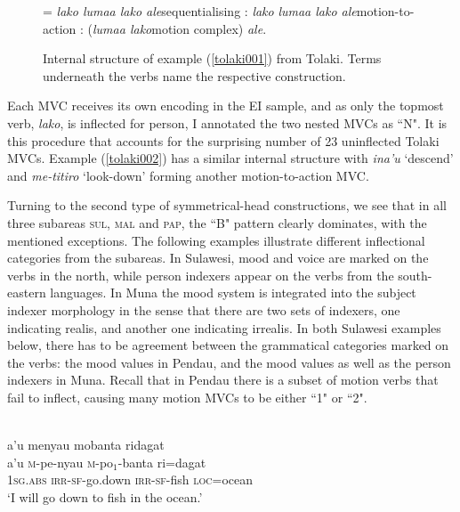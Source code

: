 \begin{figure}[h]
\jtree[xunit=8em,yunit=1em]
\! = {\textit{lako lumaa lako ale}}{sequentialising}
: {\textit{lako}} {\textit{lumaa lako ale}}{motion-to-action}
: ({\textit{lumaa lako}}{motion complex}) {\textit{ale}}.
\endjtree
\caption[Internal structure of example (\ref{tolaki001}) from Tolaki]{Internal structure of example (\ref{tolaki001}) from Tolaki. Terms underneath the verbs name the respective construction.}
\label{figure:tolakiMVC}
\end{figure}

Each MVC receives its own encoding in the EI sample, and as only the topmost verb, \textit{lako}, is inflected for person, I annotated the two nested MVCs as ``N". It is this procedure that accounts for the surprising number of 23 uninflected Tolaki MVCs. Example (\ref{tolaki002}) has a similar internal structure with \textit{ina'u} `descend' and \textit{me-titiro} `look-down' forming another motion-to-action MVC.

Turning to the second type of symmetrical-head constructions, we see that in all three subareas \textsc{sul}, \textsc{mal} and \textsc{pap}, the ``B" pattern clearly dominates, with the mentioned exceptions. The following examples illustrate different inflectional categories from the subareas. In Sulawesi, mood and voice are marked on the verbs in the north, while person indexers appear on the verbs from the south-eastern languages. In Muna the mood system is integrated into the subject indexer morphology in the sense that there are two sets of indexers, one indicating realis, and another one indicating irrealis. In both Sulawesi examples below, there has to be agreement between the grammatical categories marked on the verbs: the mood values in Pendau, and the mood values as well as the person indexers in Muna. Recall that in Pendau there is a subset of motion verbs that fail to inflect, causing many motion MVCs to be either ``1" or ``2".

\ea 
{}\\
\glll a'u menyau mobanta ridagat \\
a'u \textsc{m}-pe-nyau \textsc{m}-po$_1$-banta ri=dagat \\
1\textsc{sg}.\textsc{abs} \textsc{irr}-\textsc{sf}-go.down \textsc{irr}-\textsc{sf}-fish \textsc{loc}=ocean \\
\glft `I will go down to fish in the ocean.'\\ 
\z

